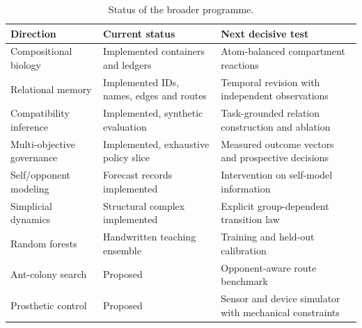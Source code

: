 \documentclass[10pt,a4paper]{article}
\begin{document}
\begin{table}[htbp]\centering\small
\caption{Status of the broader programme.}\label{tab:status}
\begin{tabular}{p{.29\linewidth}p{.21\linewidth}p{.4\linewidth}}\toprule
Direction & Current status & Next decisive test \\\midrule
Compositional biology & Implemented containers and ledgers & Atom-balanced compartment reactions \\
Relational memory & Implemented IDs, names, edges and routes & Temporal revision with independent observations \\
Compatibility inference & Implemented, synthetic evaluation & Task-grounded relation construction and ablation \\
Multi-objective governance & Implemented, exhaustive policy slice & Measured outcome vectors and prospective decisions \\
Self/opponent modeling & Forecast records implemented & Intervention on self-model information \\
Simplicial dynamics & Structural complex implemented & Explicit group-dependent transition law \\
Random forests & Handwritten teaching ensemble & Training and held-out calibration \\
Ant-colony search & Proposed & Opponent-aware route benchmark \\
Prosthetic control & Proposed & Sensor and device simulator with mechanical constraints \\\bottomrule
\end{tabular}\end{table}

\clearpage
\end{document}
